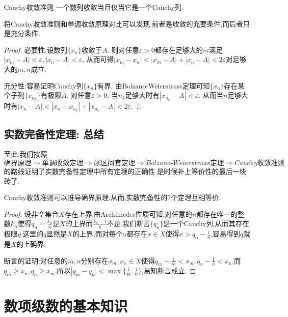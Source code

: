 \begin{theorem}{Cauchy收敛准则}
	一个数列收敛当且仅当它是一个Cauchy列.
\end{theorem}
\begin{remark}
	将Cauchy收敛准则和单调收敛原理对比可以发现:前者是收敛的充要条件,而后者只是充分条件.
\end{remark}
\begin{proof}
	必要性:设数列$\{ x_n \}$收敛于$A$. 则对任意$\varepsilon >0$都存在足够大的$m$满足$|x_m-A|<\varepsilon ,|x_n-A|<\varepsilon$, 从而可得$|x_m-x_n|<|x_m-A|+|x_n-A|<2\varepsilon$对足够大的$m,n$成立. 
	
	充分性:容易证明Cauchy列$\{ x_n \}$有界. 由Bolzano-Weierstrass定理可知$\{ x_n \}$存在某个子列$\{ x_{n_k} \}$有极限$A$. 对任意$\varepsilon >0$, 当$n_k$足够大时有$|x_{n_k} - A|<\varepsilon$. 从而当$n$足够大时有$|x_n-A|<|x_n-x_{n_k}|+|x_{n_k}-A|<2\varepsilon$. 
\end{proof}

\subsection{实数完备性定理: 总结}

至此,我们按照$$\textit{确界原理} \Rightarrow \textit{单调收敛定理} \Rightarrow \textit{闭区间套定理} \Rightarrow \textit{Bolzano-Weierstrass定理} \Rightarrow \textit{Cauchy收敛准则}$$的路线证明了实数完备性定理中所有定理的正确性.是时候补上等价性的最后一块砖了:

\begin{proposition}{}
	Cauchy收敛准则可以推导确界原理.从而,实数完备性的7个定理互相等价.
\end{proposition}
\begin{proof}
	设非空集合$X$存在上界,由Archimedes性质可知,对任意的$n$都存在唯一的整数$k_n$使得$q_n=\frac{k_n}{n}$是$X$的上界而$\frac{k_n-1}{n}$不是.我们断言$\{ q_n \}$是一个Cauchy列,从而其存在极限$q$.这里的$q$显然是$X$的上界,而对每个$n$都存在$x \in X$使得$x>q_n-\frac{1}{n}$,容易得到$q$就是$X$的上确界.
	
	断言的证明:对任意的$m,n$分别存在$x_m,x_n \in X$使得$q_m-\frac{1}{m} < x_m,q_n-\frac{1}{n} < x_n$,而$q_m \geq x_n,q_n \geq x_m$,所以$|q_m-q_n|<\max \{ \frac{1}{m},\frac{1}{n} \}$,易知断言成立.
\end{proof}

\newpage
\section{数项级数的基本知识}

